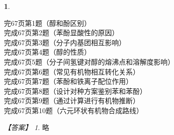\documentclass[UTF8, 10pt, a4paper, oneside]{ctexart}
\newcommand{\fs}[1]{{\fangsong #1}}%
\theoremstyle{definition}
\newtheorem{exercise}{}
\theoremstyle{remark}
\newtheorem*{answer}{【答案】}
\theoremstyle{plain}
\begin{document}
\begin{exercise}
    \begin{multicols}{2}
        \noindent 完67页第1题（醇和酚区别）\\
        完成67页第2题（苯酚显酸性的原因）\\
        完成67页第3题（分子内基团相互影响）\\
        完成67页第4题（醇的性质）\\
        完成67页5题（分子间氢键对醇的熔沸点和溶解度影响）\\
        完成67页第6题（常见有机物相互转化关系）\\
        完成67页第7题（苯酚和铁离子配位作用）\\
        完成67页第8题（设计对种方案鉴别苯和苯酚）\\
        完成67页第9题（通过计算进行有机物推断）\\
        完成67页第10题（六元环状有机物合成路线）
    \end{multicols}
    \begin{answer}
        \fs{略}
    \end{answer}
\end{exercise}
\end{document}
